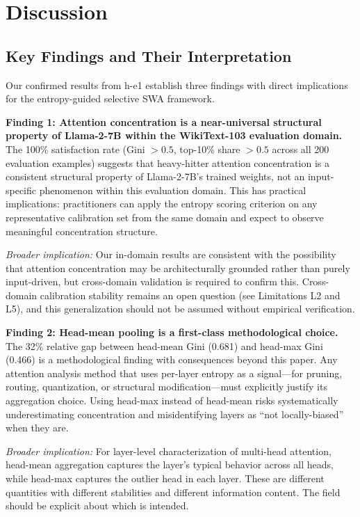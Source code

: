 \section{Discussion}
\label{sec:discussion}

\subsection{Key Findings and Their Interpretation}

Our confirmed results from h-e1 establish three findings with direct implications for the entropy-guided selective SWA framework.

\textbf{Finding 1: Attention concentration is a near-universal structural property of Llama-2-7B within the WikiText-103 evaluation domain.} The 100\% satisfaction rate (Gini $> 0.5$, top-10\% share $> 0.5$ across all 200 evaluation examples) suggests that heavy-hitter attention concentration is a consistent structural property of Llama-2-7B's trained weights, not an input-specific phenomenon within this evaluation domain. This has practical implications: practitioners can apply the entropy scoring criterion on any representative calibration set from the same domain and expect to observe meaningful concentration structure.

\textit{Broader implication:} Our in-domain results are consistent with the possibility that attention concentration may be architecturally grounded rather than purely input-driven, but cross-domain validation is required to confirm this. Cross-domain calibration stability remains an open question (see Limitations L2 and L5), and this generalization should not be assumed without empirical verification.

\textbf{Finding 2: Head-mean pooling is a first-class methodological choice.} The 32\% relative gap between head-mean Gini (0.681) and head-max Gini (0.466) is a methodological finding with consequences beyond this paper. Any attention analysis method that uses per-layer entropy as a signal---for pruning, routing, quantization, or structural modification---must explicitly justify its aggregation choice. Using head-max instead of head-mean risks systematically underestimating concentration and misidentifying layers as ``not locally-biased'' when they are.

\textit{Broader implication:} For layer-level characterization of multi-head attention, head-mean aggregation captures the layer's typical behavior across all heads, while head-max captures the outlier head in each layer. These are different quantities with different stabilities and different information content. The field should be explicit about which is intended.

